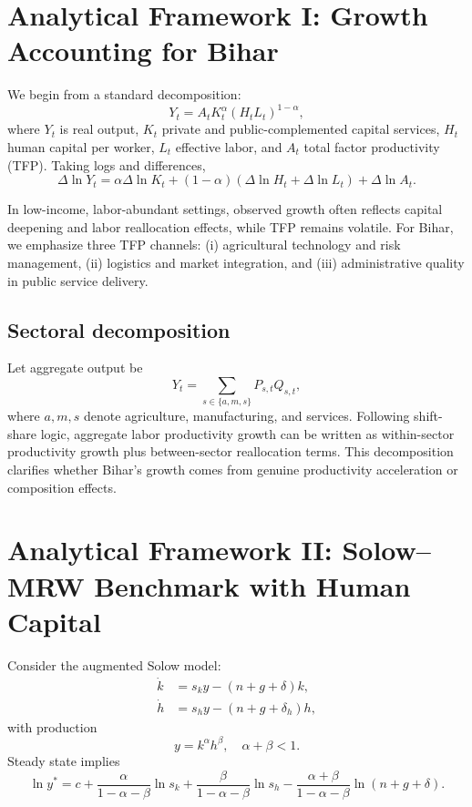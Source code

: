 \documentclass[preprint,12pt]{elsarticle}
\begin{document}
\section{Analytical Framework I: Growth Accounting for Bihar}
We begin from a standard decomposition:
\begin{equation}
Y_t = A_t K_t^{\alpha} (H_t L_t)^{1-\alpha},
\end{equation}
where $Y_t$ is real output, $K_t$ private and public-complemented capital services, $H_t$ human capital per worker, $L_t$ effective labor, and $A_t$ total factor productivity (TFP). Taking logs and differences,
\begin{equation}
\Delta \ln Y_t = \alpha \Delta \ln K_t + (1-\alpha)(\Delta \ln H_t + \Delta \ln L_t) + \Delta \ln A_t.
\end{equation}

In low-income, labor-abundant settings, observed growth often reflects capital deepening and labor reallocation effects, while TFP remains volatile. For Bihar, we emphasize three TFP channels: (i) agricultural technology and risk management, (ii) logistics and market integration, and (iii) administrative quality in public service delivery.

\subsection{Sectoral decomposition}
Let aggregate output be
\begin{equation}
Y_t = \sum_{s\in\{a,m,s\}} P_{s,t} Q_{s,t},
\end{equation}
where $a,m,s$ denote agriculture, manufacturing, and services. Following shift-share logic, aggregate labor productivity growth can be written as within-sector productivity growth plus between-sector reallocation terms. This decomposition clarifies whether Bihar's growth comes from genuine productivity acceleration or composition effects.

\section{Analytical Framework II: Solow--MRW Benchmark with Human Capital}
Consider the augmented Solow model:
\begin{align}
\dot{k} &= s_k y - (n+g+\delta)k,\\
\dot{h} &= s_h y - (n+g+\delta_h)h,
\end{align}
with production
\begin{equation}
y = k^{\alpha}h^{\beta}, \quad \alpha+\beta<1.
\end{equation}
Steady state implies
\begin{equation}
\ln y^* = c + \frac{\alpha}{1-\alpha-\beta}\ln s_k + \frac{\beta}{1-\alpha-\beta}\ln s_h - \frac{\alpha+\beta}{1-\alpha-\beta}\ln(n+g+\delta).
\end{equation}
\end{document}
